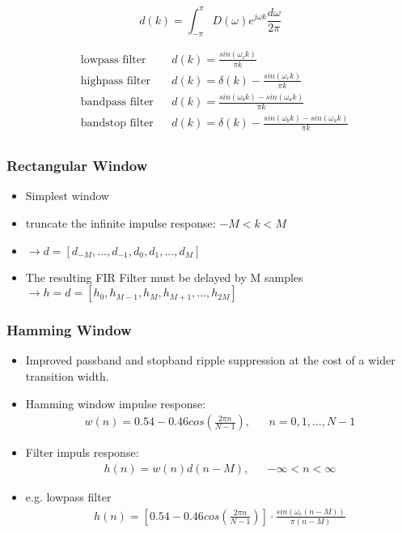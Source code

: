 \begin{equation}
d(k) = \int_{-\pi}^{\pi}D(\omega) e^{j\omega k}\frac{d\omega}{2\pi} \label{eq:impresp}
\end{equation}

\begin{align*}
&\text{lowpass filter} && d(k) = \frac{sin(\omega_ck)}{\pi k} \\
&\text{highpass filter} && d(k) = \delta(k) - \frac{sin(\omega_ck)}{\pi k} \\
&\text{bandpass filter} && d(k) = \frac{sin(\omega_bk) -sin(\omega_ak)}{\pi k} \\
&\text{bandstop filter} && d(k) = \delta(k) - \frac{sin(\omega_bk) -sin(\omega_ak)}{\pi k} \\
\end{align*}

\subsubsection{Rectangular Window}
\begin{itemize}
	\item Simplest window
	\item truncate the infinite impulse response: $-M < k < M$
	\item $\rightarrow d = [d_{-M}, ..., d_{-1}, d_0, d_1, ..., d_M]$
	\item The resulting FIR Filter must be delayed by M samples \newline
	$\rightarrow h = d = [h_0, h_{M-1}, h_M, h_{M+1}, ..., h_{2M}]$
\end{itemize}


\subsubsection{Hamming Window}
\begin{itemize}
	\item Improved passband and stopband ripple suppression at the cost of a wider transition width.
	\item Hamming window impulse response:
	\begin{align*}
		w(n) = 0.54 -0.46cos\left(\frac{2\pi n}{N-1}\right),&&n= 0,1,\dots,N-1
	\end{align*}
	\item Filter impuls response:
	\begin{align*}
		h(n) = w(n)d(n-M),&&-\infty < n < \infty
	\end{align*}
	\item e.g. lowpass filter
	\begin{align*}
		h(n) = \left[0.54 -0.46cos\left(\frac{2\pi n}{N-1}\right)\right]\cdot\frac{sin(\omega_c(n-M))}{\pi (n-M)}
	\end{align*}
	
\end{itemize}


